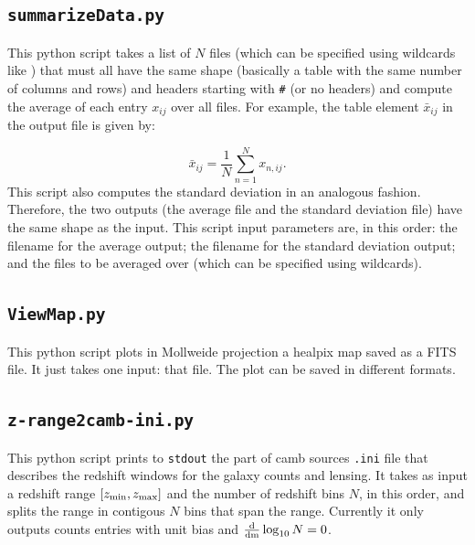 \documentclass[12pt]{book} %
\begin{document}
\subsection{{\tt summarizeData.py}}
\label{sec:summarizedata}

This {\sc python} script takes a list of $N$ files (which can be specified using wildcards like {\tt *}) 
that must all have the same shape (basically a table with the same number of columns and rows) 
and headers starting with {\tt \#} (or no headers) and compute the average of each entry $x_{ij}$ over all files. 
For example, the table element $\bar{x}_{ij}$ in the output file is given by:

\begin{equation}
\bar{x}_{ij} = \frac{1}{N}\sum_{n=1}^{N}x_{n,ij}.
\label{eq:average}
\end{equation}
This script also computes the standard deviation in an analogous fashion. 
Therefore, the two outputs (the average file and the standard deviation file) have 
the same shape as the input. This script input parameters are, in this order: 
the filename for the average output; the filename for the standard deviation output; 
and the files to be averaged over (which can be specified using wildcards).

\subsection{{\tt ViewMap.py}}
\label{sec:viewmap}

This {\sc python} script plots in Mollweide projection a {\sc healpix} map saved as a FITS file. 
It just takes one input: that file. The plot can be saved in different formats.  

\subsection{{\tt z-range2camb-ini.py}}
\label{sec:zrange2camb}

This {\sc python} script prints to {\tt stdout} the part of {\sc camb sources} {\tt .ini} file 
that describes the redshift windows for the galaxy counts and lensing. It takes as input a 
redshift range $[z_{\rm{min}}, z_{\rm{max}}]$ and the number of redshift bins $N$, in this order,
and splits the range in contigous $N$ bins that span the range. Currently it only outputs 
counts entries with unit bias and $\frac{\rm{d}}{\rm{d}m}\log_{10}N=0$.   



\end{document}
